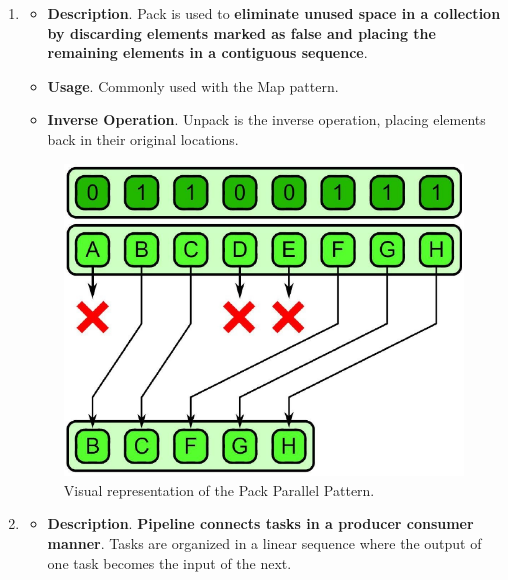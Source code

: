 \begin{enumerate}
    \item {}
    \begin{itemize}
        \item[\textcolor{Red2}{\faIcon{book}}] \textcolor{Red2}{\textbf{Description}}. Pack is used to \textbf{eliminate unused space in a collection by discarding elements marked as false and placing the remaining elements in a contiguous sequence}.

        \item[\textcolor{Green3}{\faIcon{question}}] \textcolor{Green3}{\textbf{Usage}}. Commonly used with the Map pattern.

        \item[\textcolor{Green3}{\faIcon{bookmark}}] \textcolor{Green3}{\textbf{Inverse Operation}}. Unpack is the inverse operation, placing elements back in their original locations.
    \end{itemize}
    \begin{figure}[!htp]
        \centering
        \includegraphics[width=.6\textwidth]{img/pack-pattern-1.pdf}
        \caption{Visual representation of the Pack Parallel Pattern.}
    \end{figure}


    \item {}
    \begin{itemize}
        \item[\textcolor{Red2}{\faIcon{book}}] \textcolor{Red2}{\textbf{Description}}. \textbf{Pipeline connects tasks in a producer consumer manner}. Tasks are organized in a linear sequence where the output of one task becomes the input of the next.


\end{itemize}
\end{enumerate}
